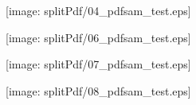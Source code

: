 \documentclass[portrait,a0c,final]{a0poster}
\newenvironment{poster}{
  \begin{center}
  \begin{minipage}[c]{0.98\textwidth}
}{
  \end{minipage} 
  \end{center}
}
\newenvironment{pcolumn}[1]{
  \begin{minipage}{#1\textwidth}
  \begin{center}
}{
  \end{center}
  \end{minipage}
}
\newcommand{\pbox}[4]{
\psshadowbox[#3]{
\begin{minipage}[t][#2][t]{#1}
#4
\end{minipage}
}}
\begin{document}
\begin{poster}
\begin{multicols}{2}
\begin{pcolumn}{0.5}
\texttt{[image: splitPdf/04\_pdfsam\_test.eps]}    
\end{pcolumn}

 \end{multicols}
\vspace{.5cm}

 \begin{multicols}{3}

\begin{pcolumn}{0.3}
\texttt{[image: splitPdf/06\_pdfsam\_test.eps]}

\end{pcolumn}
\vspace{.5cm}

\begin{pcolumn}{0.3}
\texttt{[image: splitPdf/07\_pdfsam\_test.eps]}
 
\end{pcolumn}
\vspace{.5cm}

  \begin{pcolumn}{0.3}
 
\texttt{[image: splitPdf/08\_pdfsam\_test.eps]}
\end{pcolumn}
\end{multicols}

 \begin{multicols}{2}
  \begin{pcolumn}{0.5}
 

\end{pcolumn}
\end{multicols}
\end{poster}
\end{document}
